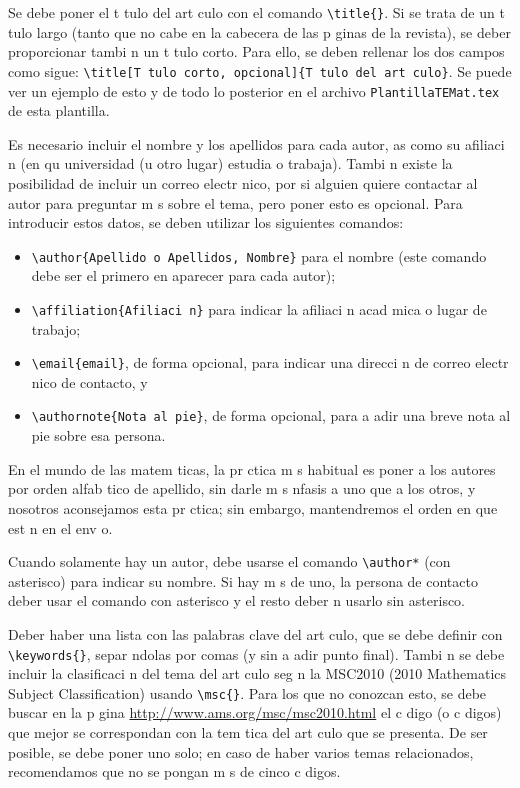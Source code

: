 \documentclass{article}
\begin{document}
Se debe poner el t tulo del art culo con el comando \verb+\title{}+.
Si se trata de un t tulo largo (tanto que no cabe en la cabecera de las p ginas de la revista), se deber  proporcionar tambi n un t tulo corto.
Para ello, se deben rellenar los dos campos como sigue: \verb+\title[T tulo corto, opcional]{T tulo del art culo}+.
Se puede ver un ejemplo de esto y de todo lo posterior en el archivo \verb+PlantillaTEMat.tex+ de esta plantilla.

Es necesario incluir el nombre y los apellidos para cada autor, as  como su afiliaci n (en qu  universidad (u otro lugar) estudia o trabaja).
Tambi n existe la posibilidad de incluir un correo electr nico, por si alguien quiere contactar al autor para preguntar m s sobre el tema, pero poner esto es opcional.
Para introducir estos datos, se deben utilizar los siguientes comandos:
\begin{itemize}
\item \verb+\author{Apellido o Apellidos, Nombre}+ para el nombre (este comando debe ser el primero en aparecer para cada autor);
\item \verb+\affiliation{Afiliaci n}+ para indicar la afiliaci n acad mica o lugar de trabajo;
\item \verb+\email{email}+, de forma opcional, para indicar una direcci n de correo electr nico de contacto, y
\item \verb+\authornote{Nota al pie}+, de forma opcional, para a adir una breve nota al pie sobre esa persona.
\end{itemize}
En el mundo de las matem ticas, la pr ctica m s habitual es poner a los autores por orden alfab tico de apellido, sin darle m s  nfasis a uno que a los otros, y nosotros aconsejamos esta pr ctica; sin embargo, mantendremos el orden en que est n en el env o.

Cuando solamente hay un autor, debe usarse el comando \verb+\author*+ (con asterisco) para indicar su nombre. Si hay m s de uno, la persona de contacto deber  usar el comando con asterisco y el resto deber n usarlo sin asterisco.

Deber  haber una lista con las palabras clave del art culo, que se debe definir con \verb+\keywords{}+, separ ndolas por comas (y sin a adir punto final).
Tambi n se debe incluir la clasificaci n del tema del art culo seg n la MSC2010 (2010 Mathematics Subject Classification) usando \verb+\msc{}+.
Para los que no conozcan esto, se debe buscar en la p gina \url{http://www.ams.org/msc/msc2010.html} el c digo (o c digos) que mejor se correspondan con la tem tica del art culo que se presenta.
De ser posible, se debe poner uno solo; en caso de haber varios temas relacionados, recomendamos que no se pongan m s de cinco c digos.
\end{document}
